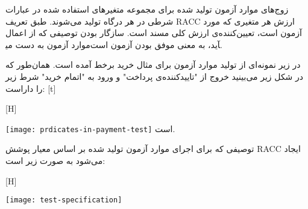 زوج‌های موارد آزمون تولید شده برای مجموعه متغیرهای استفاده شده در عبارات شرطی در هر درگاه تولید می‌شوند. طبق تعریف RACC ارزش هر متغیری که مورد آزمون است، تعیین‌کننده‌ی ارزش کلی مسند است. سازگار بودن توصیفی که از اعمال موارد آزمون به دست می‎آید، به معنی موفق بودن آزمون است.

در زیر نمونه‌ای از تولید موارد آزمون برای مثال خرید برخط آمده است. همان‌طور که در شکل زیر می‌بینید خروج از "تاییدکننده‌ی پرداخت" و ورود به "اتمام خرید" شرط زیر را داراست:
[t]
\vspace{0.5em}

[H]
\raggedright
\texttt{[image: prdicates-in-payment-test]}
\vspace{0.5em}
است.

توصیفی که برای اجرای موارد آزمون تولید شده بر اساس معیار پوشش RACC ایجاد می‌شود به صورت زیر است:



[H]
\raggedright
\texttt{[image: test-specification]}
\vspace{0.5em}


  

